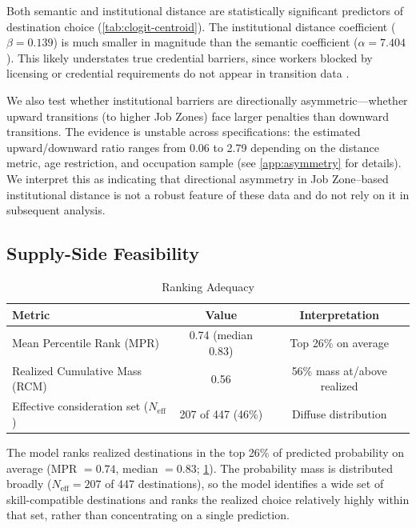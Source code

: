 \documentclass[12pt]{article}
\begin{document}
Both semantic and institutional distance are statistically significant predictors of destination choice (\cref{tab:clogit-centroid}). The institutional distance coefficient ($\beta = 0.139$) is much smaller in magnitude than the semantic coefficient ($\alpha = 7.404$). This likely understates true credential barriers, since workers blocked by licensing or credential requirements do not appear in transition data \citep{Jackson2023,Heckman1979}.


We also test whether institutional barriers are directionally asymmetric---whether upward transitions (to higher Job Zones) face larger penalties than downward transitions. The evidence is unstable across specifications: the estimated upward/downward ratio ranges from 0.06 to 2.79 depending on the distance metric, age restriction, and occupation sample (see \cref{app:asymmetry} for details). We interpret this as indicating that directional asymmetry in Job Zone--based institutional distance is not a robust feature of these data and do not rely on it in subsequent analysis.


\subsection{Supply-Side Feasibility}
\label{subsec:pathway-validation}


\begin{table}[h!]
\centering
\caption{Ranking Adequacy}
\label{tab:performance-battery}
\begin{tabular}{lcc}
\toprule
\textbf{Metric} & \textbf{Value} & \textbf{Interpretation} \\
\midrule
Mean Percentile Rank (MPR) & 0.74 (median 0.83) & Top 26\% on average \\
Realized Cumulative Mass (RCM) & 0.56 & 56\% mass at/above realized \\
Effective consideration set ($N_{\mathrm{eff}}$) & 207 of 447 (46\%) & Diffuse distribution \\
\bottomrule
\end{tabular}
\end{table}


The model ranks realized destinations in the top 26\% of predicted probability on average (MPR $= 0.74$, median $= 0.83$; \cref{tab:performance-battery}). The probability mass is distributed broadly ($N_{\mathrm{eff}} = 207$ of 447 destinations), so the model identifies a wide set of skill-compatible destinations and ranks the realized choice relatively highly within that set, rather than concentrating on a single prediction.
\end{document}
